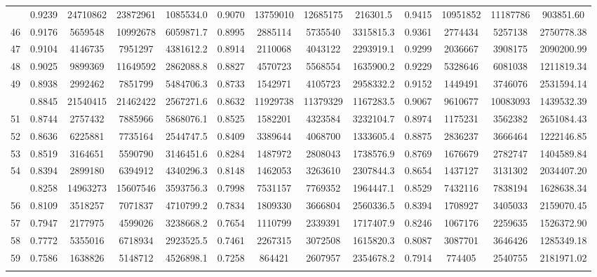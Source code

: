 \documentclass[
  12pt,
]{article}
\begin{document}
\begin{longtable}[t]{lcccccccccccc}
\addlinespace
45 & 0.9239 & 24710862 & 23872961 & 1085534.0 & 0.9070 & 13759010 & 12685175 & 216301.5 & 0.9415 & 10951852 & 11187786 & 903851.60\\
46 & 0.9176 & 5659548 & 10992678 & 6059871.7 & 0.8995 & 2885114 & 5735540 & 3315815.3 & 0.9361 & 2774434 & 5257138 & 2750778.38\\
47 & 0.9104 & 4146735 & 7951297 & 4381612.2 & 0.8914 & 2110068 & 4043122 & 2293919.1 & 0.9299 & 2036667 & 3908175 & 2090200.99\\
48 & 0.9025 & 9899369 & 11649592 & 2862088.8 & 0.8827 & 4570723 & 5568554 & 1635900.2 & 0.9229 & 5328646 & 6081038 & 1211819.34\\
49 & 0.8938 & 2992462 & 7851799 & 5484706.3 & 0.8733 & 1542971 & 4105723 & 2958332.2 & 0.9152 & 1449491 & 3746076 & 2531594.14\\
\addlinespace
50 & 0.8845 & 21540415 & 21462422 & 2567271.6 & 0.8632 & 11929738 & 11379329 & 1167283.5 & 0.9067 & 9610677 & 10083093 & 1439532.39\\
51 & 0.8744 & 2757432 & 7885966 & 5868076.1 & 0.8525 & 1582201 & 4323584 & 3232104.7 & 0.8974 & 1175231 & 3562382 & 2651084.43\\
52 & 0.8636 & 6225881 & 7735164 & 2544747.5 & 0.8409 & 3389644 & 4068700 & 1333605.4 & 0.8875 & 2836237 & 3666464 & 1222146.85\\
53 & 0.8519 & 3164651 & 5590790 & 3146451.6 & 0.8284 & 1487972 & 2808043 & 1738576.9 & 0.8769 & 1676679 & 2782747 & 1404589.84\\
54 & 0.8394 & 2899180 & 6394912 & 4340296.3 & 0.8148 & 1462053 & 3263610 & 2307844.3 & 0.8654 & 1437127 & 3131302 & 2034407.20\\
\addlinespace
55 & 0.8258 & 14963273 & 15607546 & 3593756.3 & 0.7998 & 7531157 & 7769352 & 1964447.1 & 0.8529 & 7432116 & 7838194 & 1628638.34\\
56 & 0.8109 & 3518257 & 7071837 & 4710799.2 & 0.7834 & 1809330 & 3666804 & 2560336.5 & 0.8394 & 1708927 & 3405033 & 2159070.45\\
57 & 0.7947 & 2177975 & 4599026 & 3238668.2 & 0.7654 & 1110799 & 2339391 & 1717407.9 & 0.8246 & 1067176 & 2259635 & 1526372.90\\
58 & 0.7772 & 5355016 & 6718934 & 2923525.5 & 0.7461 & 2267315 & 3072508 & 1615820.3 & 0.8087 & 3087701 & 3646426 & 1285349.18\\
59 & 0.7586 & 1638826 & 5148712 & 4526898.1 & 0.7258 & 864421 & 2607957 & 2354678.2 & 0.7914 & 774405 & 2540755 & 2181971.02\\
\addlinespace

\end{longtable}
\end{document}
